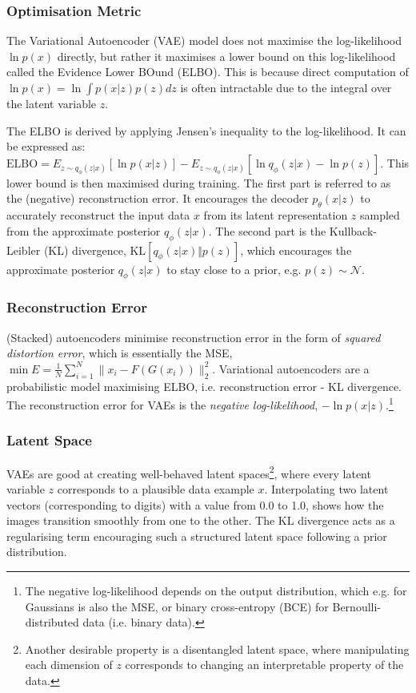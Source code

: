 \subsubsection{Optimisation Metric}

The Variational Autoencoder (VAE) model does not maximise the log-likelihood $\ln p(x)$ directly,
but rather it maximises a lower bound on this log-likelihood called the Evidence Lower BOund (ELBO).
This is because direct computation of $\ln p(x) = \ln \int p(x|z)p(z)dz$ is often intractable due to the integral over the latent variable $z$.

The ELBO is derived by applying Jensen's inequality to the log-likelihood.
It can be expressed as: $\text{ELBO} = E_{z \sim q_\phi(z|x)}[\ln p(x|z)] - E_{z \sim q_\phi(z|x)}[\ln q_\phi(z|x) - \ln p(z)]$.
This lower bound is then maximised during training.
The first part is referred to as the (negative) reconstruction error.
It encourages the decoder $p_\theta(x|z)$ to accurately reconstruct the input data $x$ from its latent representation $z$ sampled from the approximate posterior $q_\phi(z|x)$.
The second part is the Kullback-Leibler (KL) divergence, $\text{KL}[q_\phi(z|x) \Vert p(z)]$,
which encourages the approximate posterior $q_\phi(z|x)$ to stay close to a prior, e.g. $p(z) \sim \mathcal{N}$.

\subsubsection{Reconstruction Error}

(Stacked) autoencoders minimise reconstruction error in the form of \textit{squared distortion error}, which is essentially the MSE, $\min{E = \frac{1}{N} \sum_{i=1}^N{\lVert x_i - F(G(x_i)) \rVert_2^2}}$.
Variational autoencoders are a probabilistic model maximising ELBO, i.e. reconstruction error - KL divergence.
The reconstruction error for VAEs is the \textit{negative log-likelihood}, $-\ln p(x|z)$.\footnote{
    The negative log-likelihood depends on the output distribution, which e.g. for Gaussians is also the MSE,
    or binary cross-entropy (BCE) for Bernoulli-distributed data (i.e. binary data).
}

\subsubsection{Latent Space}

VAEs are good at creating well-behaved latent spaces\footnote{
    Another desirable property is a disentangled latent space, where manipulating each dimension of $z$ corresponds to changing an interpretable property of the data.
}, where every latent variable $z$ corresponds to a plausible data example $x$.
Interpolating two latent vectors (corresponding to digits) with a value from 0.0 to 1.0,
shows how the images transition smoothly from one to the other.
The KL divergence acts as a regularising term encouraging such a structured latent space following a prior distribution.

